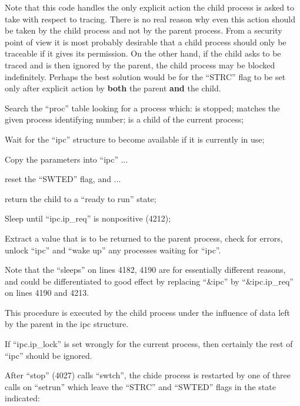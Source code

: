Note that this code handles the only
explicit action the child process is
asked to take with respect to tracing.
There is no real reason why even this
action should be taken by the child
process and not by the parent process.
From a security point of view it is
most probably desirable that a child
process should only be traceable if it
gives its permission. On the other
hand, if the child asks to be traced
and is then ignored by the parent, the
child process may be blocked indefinitely. Perhaps the best solution would
be for the ``STRC'' flag to be set only
after explicit action by {\bf both} the
parent {\bf and} the child.

\bd
\item[4172:] Search the ``proc'' table looking
for a process which: is stopped;
matches the given process identifying number;
is a child of the current process;

\item[4181:] Wait for the ``ipc'' structure to
 become available if it is currently in use;

\item[4183:] Copy the parameters into ``ipc'' ...

\item[4187:] reset the ``SWTED'' flag, and ...

\item[4188:] return the child to a ``ready to
run'' state;

\item[4189:] Sleep until ``ipc.ip\_req'' is nonpositive (4212);

\item[4191:] Extract a value that is to be
 returned to the parent process,
 check for errors, unlock ``ipc''
 and ``wake up'' any processes waiting for  ``ipc''.
\ed

Note that the ``sleeps'' on lines 4182,
4190 are for essentially different reasons, and could be differentiated to
good effect by replacing ``\&ipc'' by
``\&ipc.ip\_req'' on lines 4190 and 4213.



This procedure is executed by the child
process under the influence of data
left by the parent in the ipc structure.

\bd
\item[4209:] If ``ipc.ip\_lock'' is set wrongly
 for the current process, then
 certainly the rest of ``ipc''
 should be ignored.
\ed

After ``stop'' (4027) calls ``swtch'', the
chide process is restarted by one of
three calls on ``setrun'' which leave the
``STRC'' and ``SWTED'' flags in the state
indicated:


